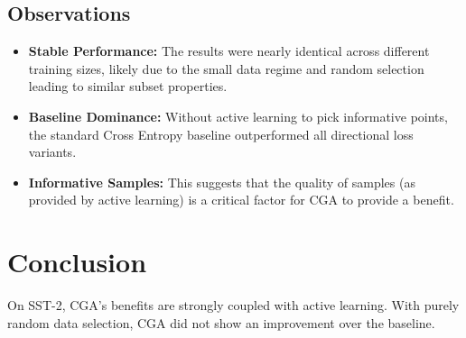 \documentclass{article}
\begin{document}
\subsection{Observations}
\begin{itemize}
    \item \textbf{Stable Performance:} The results were nearly identical across different training sizes, likely due to the small data regime and random selection leading to similar subset properties.
    \item \textbf{Baseline Dominance:} Without active learning to pick informative points, the standard Cross Entropy baseline outperformed all directional loss variants.
    \item \textbf{Informative Samples:} This suggests that the quality of samples (as provided by active learning) is a critical factor for CGA to provide a benefit.
\end{itemize}

\section{Conclusion}
On SST-2, CGA's benefits are strongly coupled with active learning. With purely random data selection, CGA did not show an improvement over the baseline.
\end{document}
